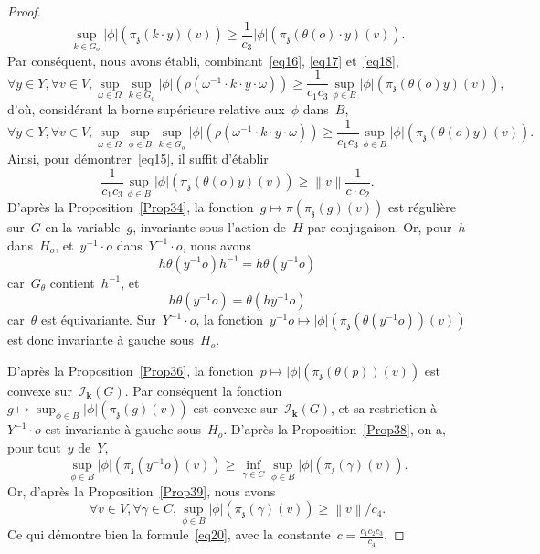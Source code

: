 \documentclass[french]{amsart}
\newcommand{\kk}{\mathbf{k}}
\newcommand{\abs}[1]{{\left|{#1}\right|}}
\newcommand{\Ik}{\mathscr{I}_\kk}
\newcommand{\lie}[1]{{\mathfrak{#1}}}
\newcommand{\Nm}[1]{{\left\|{#1}\right\|}}
\newcommand{\z}{\lie{z}}
\begin{document}
\begin{proof}
\begin{equation}\label{eq18}
\sup_{k\in G_o}\abs{\phi}(\pi_{\z}(k\cdot y)(v))\geq\frac{1}{c_3}\abs{\phi}(\pi_{\z}(\theta(o)\cdot y)(v)).
\end{equation}
Par conséquent, nous avons établi, combinant~\eqref{eq16}, \eqref{eq17} et~\eqref{eq18},
\begin{equation*}
\forall y\in Y, \forall v\in V, 
\sup_{\omega\in\Omega}\sup_{k\in G_o}\abs{\phi}\left(\rho(\omega^{-1}\cdot k\cdot y\cdot \omega)\right)
\geq
\frac{1}{c_1 c_3}\sup_{\phi\in B}\abs{\phi}(\pi_{\z}(\theta(o)y)(v)),
\end{equation*}
d'où, considérant la borne supérieure relative aux~$\phi$ dans~$B$,
\begin{equation}\label{eq19}
\forall y\in Y, \forall v\in V, 
\sup_{\omega\in\Omega}\sup_{\phi\in B}\sup_{k\in G_o}\abs{\phi}\left(\rho(\omega^{-1}\cdot k\cdot y\cdot \omega)\right)
\geq
\frac{1}{c_1 c_3}\sup_{\phi\in B}\abs{\phi}(\pi_{\z}(\theta(o)y)(v)).
\end{equation}
Ainsi, pour démontrer~\eqref{eq15}, il suffit d'établir
\begin{equation}\label{eq20}
\frac{1}{c_1 c_3}\sup_{\phi\in B}\abs{\phi}(\pi_{\z}(\theta(o)y)(v))
\geq
\Nm{v}\frac{1}{c\cdot c_2}.
\end{equation}
D'après la Proposition~\ref{Prop34}, la fonction~$g\mapsto \pi(\pi_{\z}(g)(v))$ est régulière sur~$G$ en la variable~$g$, invariante sous l'action de~$H$ par conjugaison. Or, pour~$h$ dans~$H_o$, et~$y^{-1}\cdot o$ dans~$Y^{-1}\cdot o$, nous avons
\begin{equation*}
h\theta(y^{-1}o)h^{-1} = h\theta(y^{-1}o)
\end{equation*}
car~$G_\theta$ contient~$h^{-1}$, et
\begin{equation*}
h\theta(y^{-1}o) = \theta(h y^{-1}o)
\end{equation*}
car~$\theta$ est équivariante. Sur~$Y^{-1}\cdot o$, la fonction~$y^{-1}o\mapsto\abs{\phi}(\pi_{\z}(\theta(y^{-1}o))(v))$ est donc invariante à gauche sous~$H_o$.

D'après la Proposition~\ref{Prop36}, la fonction~$p\mapsto\abs{\phi}(\pi_{\z}(\theta(p))(v))$ est convexe sur~$\Ik(G)$. Par conséquent la fonction~$g\mapsto \sup_{\phi\in B}\abs{\phi}(\pi_{\z}(g)(v))$
est convexe sur~$\Ik(G)$, et sa restriction à~$Y^{-1}\cdot o$ est invariante à gauche sous~$H_o$. D'après la Proposition~\ref{Prop38}, on a, pour tout~$y$ de~$Y$, 
\begin{equation*}
\sup_{\phi\in B} \abs{\phi}(\pi_{\z}(y^{-1}o)(v))
\geq
\inf_{\gamma\in C}
\sup_{\phi\in B}\abs{\phi}(\pi_{\z}(\gamma)(v)).
\end{equation*}
Or, d'après la Proposition~\ref{Prop39}, nous avons
\begin{equation*}
\forall v\in V, \forall\gamma\in C, 
\sup_{\phi\in B}\abs{\phi}(\pi_{\z}(\gamma)(v))\geq \Nm{v}/c_4.
\end{equation*}
Ce qui démontre bien la formule~\eqref{eq20}, avec la constante~$c=
\frac{c_1c_2c_3}{c_4}$.
\end{proof}
\end{document}
